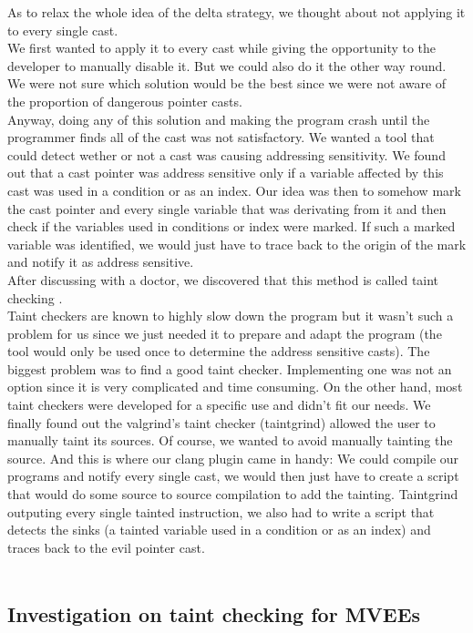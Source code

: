 \documentclass[english]{enstaPRE}
\begin{document}
As to relax the whole idea of the delta strategy, we thought about not applying it to every single cast. \\
We first wanted to apply it to every cast while giving the opportunity to the developer to manually disable it. But we could also do
it the other way round. We were not sure which solution would be the best since we were not aware of the proportion of dangerous pointer casts. \\ Anyway, doing any of this solution and making the program crash until the programmer finds all
of the cast was not satisfactory.
We wanted a tool that could detect wether or not a cast was causing addressing sensitivity. We found out that a cast pointer was
address sensitive only if a variable affected by this cast was used in a condition or as an index.
Our idea was then to somehow mark the cast pointer and every single variable that was derivating from it and then check if the variables
used in conditions or index were marked. If such a marked variable was identified, we would just have to trace back to the origin of
the mark and notify it as address sensitive. \\ 
After discussing with a doctor, we discovered that this method is called taint checking \cite{taint}. \\
Taint checkers are known to highly slow down the program but it wasn't such a problem for us since we just needed it to prepare and 
adapt the program (the tool would only be used once to determine the address sensitive casts). The biggest problem was to find a good 
taint checker. Implementing one was not an option since it is very complicated and time consuming. On the other hand, most taint 
checkers were developed for a specific use and didn't fit our needs. We finally found out the valgrind's taint checker (taintgrind)
allowed the user to manually taint its sources. Of course, we wanted to avoid manually tainting the source. And this is where our
clang plugin came in handy: We could compile our programs and notify every single cast, we would then just have to create a script 
that would do some source to source compilation to add the tainting. Taintgrind outputing every single tainted instruction, we also had to write a script
that detects the sinks (a tainted variable used
in a condition or as an index) and traces back to the evil pointer cast. \\ \\

\subsection{Investigation on taint checking for MVEEs}
\end{document}
